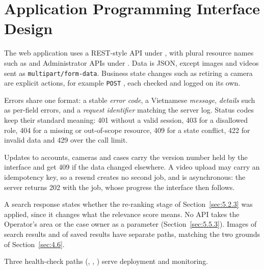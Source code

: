 \section{Application Programming Interface Design}
\label{sec:5.4}

The web application uses a REST-style API under , with plural resource names such as  and Administrator APIs under . Data is JSON, except images and videos sent as \texttt{multipart/form-data}. Business state changes such as retiring a camera are explicit actions, for example \texttt{POST} , each checked and logged on its own.

Errors share one format: a stable \emph{error code}, a Vietnamese \emph{message}, \emph{details} such as per-field errors, and a \emph{request identifier} matching the server log. Status codes keep their standard meaning: 401 without a valid session, 403 for a disallowed role, 404 for a missing or out-of-scope resource, 409 for a state conflict, 422 for invalid data and 429 over the call limit.

Updates to accounts, cameras and cases carry the version number held by the interface and get 409 if the data changed elsewhere. A video upload may carry an idempotency key, so a resend creates no second job, and is asynchronous: the server returns 202 with the job, whose progress the interface then follows.

A search response states whether the re-ranking stage of Section~\ref{sec:5.2.3} was applied, since it changes what the relevance score means. No API takes the Operator's area or the case owner as a parameter (Section~\ref{sec:5.5.3}). Images of search results and of saved results have separate paths, matching the two grounds of Section~\ref{sec:4.6}.

Three health-check paths (, , ) serve deployment and monitoring.
